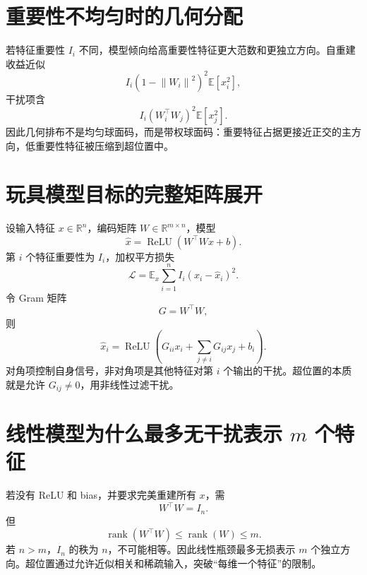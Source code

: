 \documentclass[UTF8,12pt,a4paper,fontset=none]{ctexart}
\numberwithin{equation}{section}
\newcommand{\R}{\mathbb{R}}
\newcommand{\E}{\mathbb{E}}
\newcommand{\Loss}{\mathcal{L}}
\newcommand{\norm}[1]{\left\lVert #1\right\rVert}
\newcommand{\rank}{\operatorname{rank}}
\begin{document}
\section{重要性不均匀时的几何分配}
若特征重要性 $I_i$ 不同，模型倾向给高重要性特征更大范数和更独立方向。自重建收益近似
\begin{equation}
 I_i(1-\norm{W_i}^2)^2\E[x_i^2],
\end{equation}
干扰项含
\begin{equation}
 I_i(W_i^\top W_j)^2\E[x_j^2].
\end{equation}
因此几何排布不是均匀球面码，而是带权球面码：重要特征占据更接近正交的主方向，低重要性特征被压缩到超位置中。
\clearpage
\section{玩具模型目标的完整矩阵展开}
设输入特征 $x\in\R^n$，编码矩阵 $W\in\R^{m\times n}$，模型
\begin{equation}
 \widehat x=\operatorname{ReLU}(W^\top Wx+b).
\end{equation}
第 $i$ 个特征重要性为 $I_i$，加权平方损失
\begin{equation}
 \Loss=\E_x\sum_{i=1}^{n}I_i(x_i-\widehat x_i)^2.
\end{equation}
令 Gram 矩阵
\begin{equation}
 G=W^\top W,
\end{equation}
则
\begin{equation}
 \widehat x_i=\operatorname{ReLU}
 \left(G_{ii}x_i+
 \sum_{j\ne i}G_{ij}x_j+b_i\right).
\end{equation}
对角项控制自身信号，非对角项是其他特征对第 $i$ 个输出的干扰。超位置的本质就是允许 $G_{ij}\ne0$，用非线性过滤干扰。

\section{线性模型为什么最多无干扰表示 $m$ 个特征}
若没有 ReLU 和 bias，并要求完美重建所有 $x$，需
\begin{equation}
 W^\top W=I_n.
\end{equation}
但
\begin{equation}
 \rank(W^\top W)\le\rank(W)\le m.
\end{equation}
若 $n>m$，$I_n$ 的秩为 $n$，不可能相等。因此线性瓶颈最多无损表示 $m$ 个独立方向。超位置通过允许近似相关和稀疏输入，突破“每维一个特征”的限制。
\end{document}
